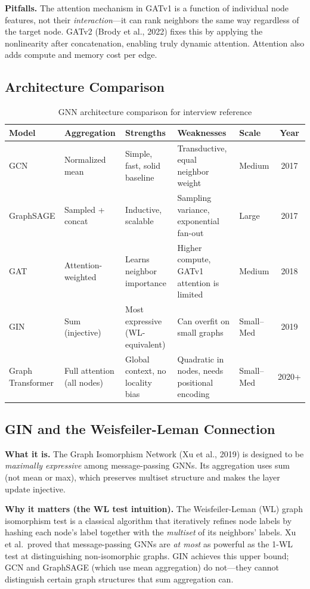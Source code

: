 \textbf{Pitfalls.} The attention mechanism in GATv1 is a function of individual node features, not their \textit{interaction}---it can rank neighbors the same way regardless of the target node. GATv2 (Brody et al., 2022) fixes this by applying the nonlinearity after concatenation, enabling truly dynamic attention. Attention also adds compute and memory cost per edge.

\subsection{Architecture Comparison}

\begin{table}[H]
\centering
\caption{GNN architecture comparison for interview reference}
\begin{tabularx}{\textwidth}{lXXXXc}
\toprule
\textbf{Model} & \textbf{Aggregation} & \textbf{Strengths} & \textbf{Weaknesses} & \textbf{Scale} & \textbf{Year} \\
\midrule
GCN & Normalized mean & Simple, fast, solid baseline & Transductive, equal neighbor weight & Medium & 2017 \\
GraphSAGE & Sampled + concat & Inductive, scalable & Sampling variance, exponential fan-out & Large & 2017 \\
GAT & Attention-weighted & Learns neighbor importance & Higher compute, GATv1 attention is limited & Medium & 2018 \\
GIN & Sum (injective) & Most expressive (WL-equivalent) & Can overfit on small graphs & Small--Med & 2019 \\
Graph Transformer & Full attention (all nodes) & Global context, no locality bias & Quadratic in nodes, needs positional encoding & Small--Med & 2020+ \\
\bottomrule
\end{tabularx}
\end{table}

\subsection{GIN and the Weisfeiler-Leman Connection}

\textbf{What it is.} The Graph Isomorphism Network (Xu et al., 2019) is designed to be \textit{maximally expressive} among message-passing GNNs. Its aggregation uses sum (not mean or max), which preserves multiset structure and makes the layer update injective.

\textbf{Why it matters (the WL test intuition).} The Weisfeiler-Leman (WL) graph isomorphism test is a classical algorithm that iteratively refines node labels by hashing each node's label together with the \textit{multiset} of its neighbors' labels. Xu et al.\ proved that message-passing GNNs are \textit{at most} as powerful as the 1-WL test at distinguishing non-isomorphic graphs. GIN achieves this upper bound; GCN and GraphSAGE (which use mean aggregation) do not---they cannot distinguish certain graph structures that sum aggregation can.

